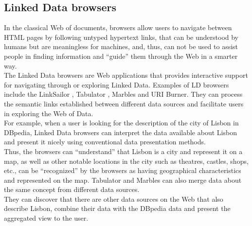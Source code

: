 \documentclass[a4paper,12pt,oneside]{report}
\begin{document}
{{{\subsection{Linked Data browsers}
{In the classical Web of documents, browsers allow users to navigate between HTML pages by following untyped hypertext links, that can be understood by humans but are meaningless for machines, and, thus, can not be used to assist people in finding information and “guide” them through the Web in a smarter way.\\
 The Linked Data browsers are Web applications that provides interactive support for navigating through or exploring Linked Data. Examples of LD browsers include the LinkSailor , Tabulator , Marbles and URI Burner. They can process
the semantic links established between different data sources and facilitate users in exploring the Web of Data.\\
 For example, when a user is looking for the description of the city of Lisbon in DBpedia, Linked Data browsers can interpret the data available about Lisbon and present it nicely using conventional data presentation methods.\\
Thus, the browsers can “understand” that Lisbon is a city and represent it on a map, as well as other notable locations in the city such as theatres, castles, shops, etc., can be “recognized” by the browsers as having geographical characteristics and represented on the map. Tabulator and Marbles can also merge data about the same concept from different data sources.\\
They can discover that there are other data sources on the Web that also describe Lisbon, combine their data with the DBpedia data and present the aggregated view to the user.}
}}}
\end{document}
